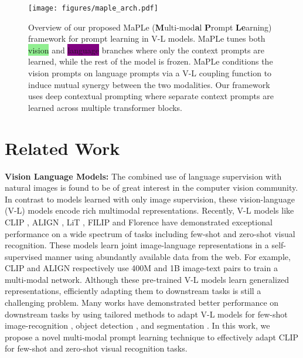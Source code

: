 \documentclass[10pt,twocolumn,letterpaper]{article}
\begin{document}
\begin{figure*}[!t]
\centering
{\texttt{[image: figures/maple\_arch.pdf]}}
\caption{\small Overview of our proposed MaPLe (\textbf{M}ulti-mod\textbf{a}l \textbf{P}rompt \textbf{Le}arning) framework for prompt learning in V-L models. MaPLe tunes both {\setlength{\fboxsep}{0.7pt}\colorbox{lightgreen}{vision}} and {\setlength{\fboxsep}{0.7pt}\colorbox{purple}{language}} branches where only the  {\setlength{\fboxsep}{0.7pt}\colorbox{lightred}{context prompts}} are learned, while the rest of the model is frozen. MaPLe conditions the vision prompts on language prompts via a V-L coupling function  to induce mutual synergy between the two modalities. Our framework uses deep contextual prompting where separate context prompts are learned across multiple transformer blocks.}
\label{ovd_block_diag}
\end{figure*}


\section{Related Work}
\noindent \textbf{Vision Language Models:}
The combined use of language supervision with natural images is found to be of great interest in the computer vision community. In contrast to models learned with only image supervision, these vision-language (V-L) models encode rich multimodal representations. Recently, V-L models like CLIP \cite{radford2021learning}, ALIGN \cite{jia2021scaling}, LiT \cite{zhai2022lit}, FILIP \cite{yao2021filip} and Florence \cite{yuan2021florence} have demonstrated exceptional performance on a wide spectrum of tasks including few-shot and zero-shot visual recognition. These models learn joint image-language representations in a self-supervised manner using abundantly available data from the web.
For example, CLIP and ALIGN respectively use 400M and 1B image-text pairs to train a multi-modal network. Although these pre-trained V-L models learn generalized representations, efficiently adapting them to downstream tasks is still a challenging problem. Many works have demonstrated better performance on downstream tasks by using tailored methods to adapt V-L models for few-shot image-recognition \cite{gao2021clip,zhang2021tip,kim2022how}, object detection \cite{rasheed2022bridging, Maaz2022Multimodal, zhou2022detecting, gu2021open, zang2022open, feng2022promptdet}, and segmentation \cite{li2022language,rao2022denseclip,ding2022decoupling,luddecke2022image}. 
In this work, we propose a novel multi-modal prompt learning technique to effectively adapt CLIP for few-shot and zero-shot visual recognition tasks.
\end{document}
